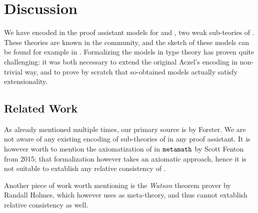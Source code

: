 \documentclass[sigplan,10pt,anonymous,review]{acmart}%
\begin{document}
\section{Discussion}\label{sect:discussion}
We have encoded in the \Coq{} proof assistant models for \NFTWO{} and \NFO{}, two weak sub-teories of \NF{}. These theories are known in the \NF{} community, and the sketch of these models can be found for example in \cite{Forster2001}. Formalizing the models in type theory has proven quite challenging: it was both necessary to extend the original Aczel's encoding in non-trivial way, and to prove by scratch that so-obtained models actually satisfy extensionality.

\subsection{Related Work}
As already mentioned multiple times, our primary source is \cite{Forster2001} by Forster. We are not aware of any existing encoding of sub-theories of \NF{} in any proof assistant.
It is however worth to mention the axiomatization of \NF{} in $\text{\texttt{metamath}}$ by Scott Fenton from 2015\footnotemark; that formalization however takes an axiomatic approach, hence it is not suitable to extablish any relative consistency of \NF{}.

Another piece of work worth mentioning is the \emph{Watson} theorem prover by Randall Holmes\footnotemark, which however uses \NF{} as meta-theory, and thus cannot extablish relative consistency as well.
\end{document}
